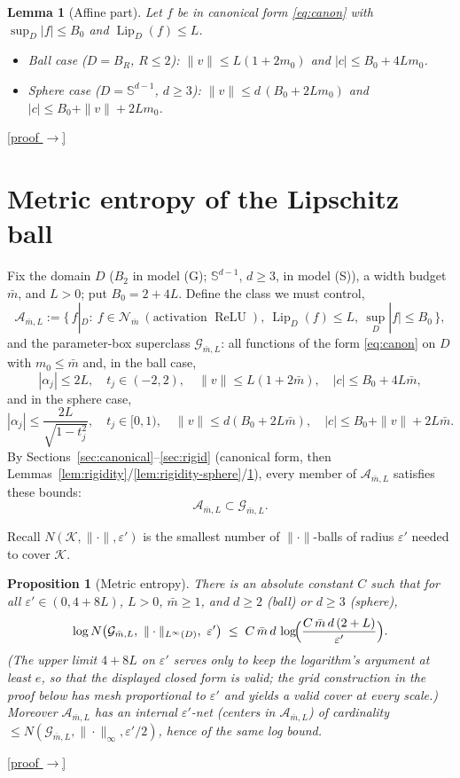 \documentclass[11pt,reqno]{amsart}
\theoremstyle{plain}
\newtheorem{proposition}[theorem]{Proposition}
\newtheorem{lemma}[theorem]{Lemma}
\theoremstyle{definition}
\theoremstyle{remark}
\newcommand{\Sd}{\mathbb{S}^{d-1}}
\newcommand{\eps}{\varepsilon}
\newcommand{\Lip}{\operatorname{Lip}}
\newcommand{\relu}{\operatorname{ReLU}}
\newcommand{\NN}{\mathcal{N}}
\newcommand{\GG}{\mathcal{G}}
\newcommand{\AAA}{\mathcal{A}}
\newcommand{\proofbutton}[1]{\hyperref[proof:#1]{\textnormal{\footnotesize\textsf{[proof $\to$]}}}}
\begin{document}
\begin{lemma}[Affine part]\label{lem:affine}
Let $f$ be in canonical form \eqref{eq:canon} with $\sup_D|f|\le B_0$ and $\Lip_D(f)\le L$.
\begin{itemize}
\item[(i)] Ball case ($D=B_R$, $R\le2$): $\|v\|\le L(1+2m_0)$ and $|c|\le B_0+4Lm_0$.
\item[(ii)] Sphere case ($D=\Sd$, $d\ge3$): $\|v\|\le d\,(B_0+2Lm_0)$ and $|c|\le B_0+\|v\|+2Lm_0$.
\end{itemize}
\end{lemma}
\proofbutton{affine}

\section{Metric entropy of the Lipschitz ball}\label{sec:entropy}

Fix the domain $D$ ($B_2$ in model (G); $\Sd$, $d\ge3$, in model (S)), a width budget $\bar m$, and $L>0$; put $B_0=2+4L$. Define the class we must control,
\[
\AAA_{\bar m,L}:=\bigl\{\,f|_D:\ f\in\NN_{\bar m}\ (\text{activation }\relu),\ \Lip_D(f)\le L,\ \sup_D|f|\le B_0\,\bigr\},
\]
and the parameter-box superclass $\GG_{\bar m,L}$: all functions of the form \eqref{eq:canon} on $D$ with $m_0\le\bar m$ and, in the ball case,
\[
|\alpha_j|\le2L,\quad t_j\in(-2,2),\quad\|v\|\le L(1+2\bar m),\quad|c|\le B_0+4L\bar m,
\]
and in the sphere case,
\[
|\alpha_j|\le\frac{2L}{\sqrt{1-t_j^2}},\quad t_j\in[0,1),\quad\|v\|\le d(B_0+2L\bar m),\quad|c|\le B_0+\|v\|+2L\bar m.
\]
By Sections~\ref{sec:canonical}--\ref{sec:rigid} (canonical form, then Lemmas~\ref{lem:rigidity}/\ref{lem:rigidity-sphere}/\ref{lem:affine}), every member of $\AAA_{\bar m,L}$ satisfies these bounds:
\begin{equation}\label{eq:AinG}
\AAA_{\bar m,L}\subset\GG_{\bar m,L}.
\end{equation}

Recall $N(\mathcal K,\|\cdot\|,\eps')$ is the smallest number of $\|\cdot\|$-balls of radius $\eps'$ needed to cover $\mathcal K$.

\begin{proposition}[Metric entropy]\label{prop:entropy}
There is an absolute constant $C$ such that for all $\eps'\in(0,4+8L)$, $L>0$, $\bar m\ge1$, and $d\ge2$ (ball) or $d\ge3$ (sphere),
\[
\log N\bigl(\GG_{\bar m,L},\ \|\cdot\|_{L^\infty(D)},\ \eps'\bigr)\;\le\;C\,\bar m\,d\,\log\!\Bigl(\frac{C\,\bar m\,d\,(2+L)}{\eps'}\Bigr).
\]
(The upper limit $4+8L$ on $\eps'$ serves only to keep the logarithm's argument at least $e$, so that the displayed closed form is valid; the grid construction in the proof below has mesh proportional to $\eps'$ and yields a valid cover at every scale.) Moreover $\AAA_{\bar m,L}$ has an internal $\eps'$-net (centers in $\AAA_{\bar m,L}$) of cardinality $\le N(\GG_{\bar m,L},\|\cdot\|_\infty,\eps'/2)$, hence of the same log bound.
\end{proposition}
\proofbutton{entropy}
\end{document}
